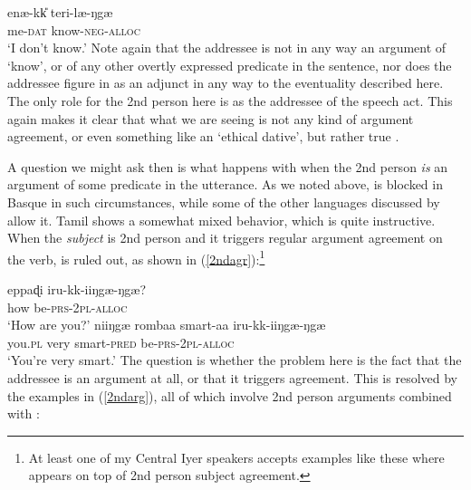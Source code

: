 \documentclass[output=paper, modfonts, nonflat]{langsci/langscibook}
\begin{document}
\ea\label{dunno}\gll enæ-kk\U{} teri-læ-ŋgæ\\
me-\textsc{dat}{} know-\textsc{neg}-\textsc{alloc}\\
\glt `I don't know.'
\z
%
Note again that the addressee is not in any way an argument of `know',
or of any other overtly expressed predicate in the sentence, nor does
the addressee figure in as an adjunct in any way to the eventuality
described here. The only role for the 2nd person here is as the
addressee of the speech act. This again makes it clear that what we
are seeing is not any kind of argument agreement, or even something
like an `ethical dative', but rather true \allagr.


A question we might ask then is what happens with \allagr{} when the
2nd person \emph{is} an argument of some predicate in the
utterance. As we noted above, \allagr{} is blocked in Basque in such
circumstances, while some of the other languages discussed by
\citet{antonov:2015} allow it. Tamil shows a somewhat mixed behavior,
which is quite instructive. When the \emph{subject} is 2nd person and
it triggers regular argument agreement on the verb, \allagr{} is ruled
out, as shown in (\ref{2ndagr}):\footnote{At least one of my Central
  Iyer speakers accepts examples like these where \allagr{} appears on
  top of 2nd person subject agreement.}

\ea\label{2ndagr}
  \ea
    \label{howare}\gll *eppaɖi iru-kk-iiŋgæ-ŋgæ?\\
    how be-\textsc{prs}-2\textsc{pl}-\textsc{alloc}\\
    \glt `How are you?'
  \ex
    \label{smart}\gll *niiŋgæ{} rombaa smart-aa iru-kk-iiŋgæ-ŋgæ\\
    you.\textsc{pl} very smart-\textsc{pred}{} be-\textsc{prs}-2\textsc{pl}-\textsc{alloc}\\
    \glt `You're very smart.'
  \z
\z
%
The question is whether the problem here is the fact that the
addressee is an argument at all, or that it triggers
agreement. %
This is resolved by the examples in (\ref{2ndarg}), all of which
involve 2nd person arguments combined with \allagr:
\end{document}
